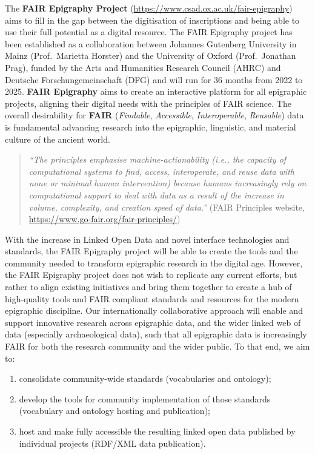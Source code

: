 \documentclass[
]{article}
\providecommand{\tightlist}{%
  \setlength{\itemsep}{0pt}\setlength{\parskip}{0pt}}
\begin{document}
The \textbf{FAIR Epigraphy Project}
(\url{https://www.csad.ox.ac.uk/fair-epigraphy}) aims to fill in the gap
between the digitisation of inscriptions and being able to use their
full potential as a digital resource. The FAIR Epigraphy project has
been established as a collaboration between Johannes Gutenberg
University in Mainz (Prof.~Marietta Horster) and the University of
Oxford (Prof.~Jonathan Prag), funded by the Arts and Humanities Research
Council (AHRC) and Deutsche Forschungemeinschaft (DFG) and will run for
36 months from 2022 to 2025. \textbf{FAIR Epigraphy} aims to create an
interactive platform for all epigraphic projects, aligning their digital
needs with the principles of FAIR science. The overall desirability for
\textbf{FAIR} (\emph{Findable}, \emph{Accessible}, \emph{Interoperable},
\emph{Reusable}) data is fundamental advancing research into the
epigraphic, linguistic, and material culture of the ancient world.

\begin{quote}
\emph{``The principles emphasise machine-actionability (i.e., the
capacity of computational systems to find, access, interoperate, and
reuse data with none or minimal human intervention) because humans
increasingly rely on computational support to deal with data as a result
of the increase in volume, complexity, and creation speed of data.''}
(FAIR Principles website,
\url{https://www.go-fair.org/fair-principles/})
\end{quote}

With the increase in Linked Open Data and novel interface technologies
and standards, the FAIR Epigraphy project will be able to create the
tools and the community needed to transform epigraphic research in the
digital age. However, the FAIR Epigraphy project does not wish to
replicate any current efforts, but rather to align existing initiatives
and bring them together to create a hub of high-quality tools and FAIR
compliant standards and resources for the modern epigraphic discipline.
Our internationally collaborative approach will enable and support
innovative research across epigraphic data, and the wider linked web of
data (especially archaeological data), such that all epigraphic data is
increasingly FAIR for both the research community and the wider public.
To that end, we aim to:

\begin{enumerate}
\def\labelenumi{\arabic{enumi}.}
\tightlist
\item
  consolidate community-wide standards (vocabularies and ontology);
\item
  develop the tools for community implementation of those standards
  (vocabulary and ontology hosting and publication);
\item
  host and make fully accessible the resulting linked open data
  published by individual projects (RDF/XML data publication).
\end{enumerate}
\end{document}
